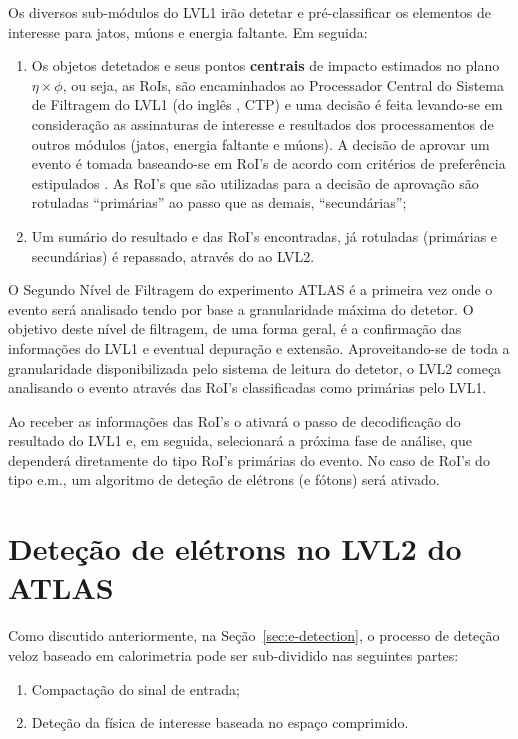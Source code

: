 Os diversos sub-módulos do LVL1 irão detetar e pré-classificar os elementos de
interesse para jatos, múons e energia faltante. Em seguida:

\begin{enumerate}
\item Os objetos detetados e seus pontos \textbf{centrais} de impacto
estimados no plano $\eta\times\phi$, ou seja, as RoIs, são encaminhados ao
Processador Central do Sistema de Filtragem do LVL1 (do inglês , CTP) e uma decisão é feita levando-se em consideração as
assinaturas de interesse e resultados dos processamentos de outros módulos
(jatos, energia faltante e múons). A decisão de aprovar um evento é tomada
baseando-se em RoI's de acordo com critérios de preferência estipulados . As RoI's que são utilizadas para a decisão de aprovação são rotuladas
``primárias'' ao passo que as demais, ``secundárias'';

\item Um sumário do resultado e das RoI's encontradas, já rotuladas (primárias
e secundárias) é repassado, através do  ao LVL2.
\end{enumerate}

O Segundo Nível de Filtragem do experimento ATLAS é a primeira vez onde o
evento será analisado tendo por base a granularidade máxima do detetor. O
objetivo deste nível de filtragem, de uma forma geral, é a confirmação das
informações do LVL1 e eventual depuração e extensão. Aproveitando-se de toda
a granularidade disponibilizada pelo sistema de leitura do detetor, o LVL2
começa analisando o evento através das RoI's classificadas como primárias pelo
LVL1.

Ao receber as informações das RoI's o  ativará o passo de
decodificação do resultado do LVL1 e, em seguida, selecionará a próxima fase
de análise, que dependerá diretamente do tipo RoI's primárias do evento. No
caso de RoI's do tipo e.m., um algoritmo de deteção de elétrons (e fótons)
será ativado.

\section{Deteção de elétrons no LVL2 do ATLAS}
\label{sec:classic-detection}

Como discutido anteriormente, na Seção~\ref{sec:e-detection}, o processo de
deteção veloz baseado em calorimetria pode ser sub-dividido nas seguintes partes:

\begin{enumerate}
\item Compactação do sinal de entrada;
\item Deteção da física de interesse baseada no espaço comprimido.
\end{enumerate}

